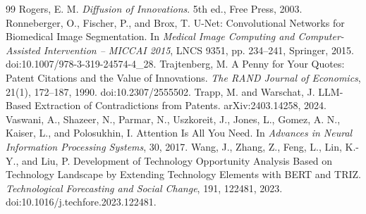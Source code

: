 \begin{thebibliography}{99}
 Rogers, E. M. \textit{Diffusion of Innovations}. 5th ed., Free Press, 2003.
 Ronneberger, O., Fischer, P., and Brox, T. U-Net: Convolutional Networks for Biomedical Image Segmentation. In \textit{Medical Image Computing and Computer-Assisted Intervention -- MICCAI 2015}, LNCS 9351, pp. 234--241, Springer, 2015. doi:10.1007/978-3-319-24574-4\_28.
 Trajtenberg, M. A Penny for Your Quotes: Patent Citations and the Value of Innovations. \textit{The RAND Journal of Economics}, 21(1), 172--187, 1990. doi:10.2307/2555502.
 Trapp, M. and Warschat, J. LLM-Based Extraction of Contradictions from Patents. arXiv:2403.14258, 2024.
 Vaswani, A., Shazeer, N., Parmar, N., Uszkoreit, J., Jones, L., Gomez, A. N., Kaiser, L., and Polosukhin, I. Attention Is All You Need. In \textit{Advances in Neural Information Processing Systems}, 30, 2017.
 Wang, J., Zhang, Z., Feng, L., Lin, K.-Y., and Liu, P. Development of Technology Opportunity Analysis Based on Technology Landscape by Extending Technology Elements with BERT and TRIZ. \textit{Technological Forecasting and Social Change}, 191, 122481, 2023. doi:10.1016/j.techfore.2023.122481.
\end{thebibliography}
